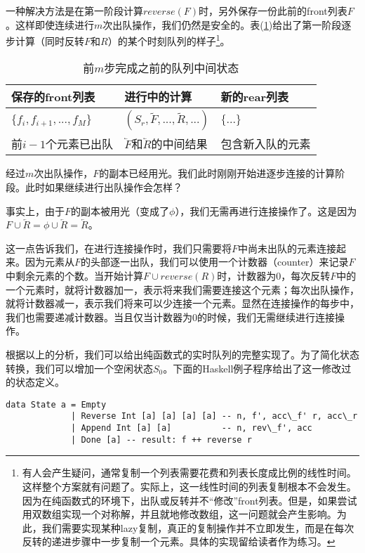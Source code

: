 \documentclass[UTF8]{article}
\begin{document}
一种解决方法是在第一阶段计算$reverse(F)$时，另外保存一份此前的front列表$F$。这样即使连续进行$m$次出队操作，我们仍然是安全的。表(\ref{tab:pop-before-m})给出了第一阶段逐步计算（同时反转$F$和$R$）的某个时刻队列的样子\footnote{有人会产生疑问，通常复制一个列表需要花费和列表长度成比例的线性时间。这样整个方案就有问题了。实际上，这一线性时间的列表复制根本不会发生。因为在纯函数式的环境下，出队或反转并不“修改”front列表。但是，如果尝试用双数组实现一个对称解，并且就地修改数组，这一问题就会产生影响。为此，我们需要实现某种lazy复制，真正的复制操作并不立即发生，而是在每次反转的递进步骤中一步复制一个元素。具体的实现留给读者作为练习。}。

\begin{table}[htbp]
\centering
\begin{tabular}{l l l}
  保存的front列表 & 进行中的计算 & 新的rear列表 \\
  \hline
  $\{ f_i, f_{i+1}, ..., f_M \}$ & $(S_r, \tilde{F}, ..., \tilde{R}, ...)$ & $ \{ ... \}$ \\
  前$i-1$个元素已出队 & $\overleftarrow{F}$和$\overleftarrow{R}$的中间结果 & 包含新入队的元素
\end{tabular}
\caption{前$m$步完成之前的队列中间状态}
\label{tab:pop-before-m}
\end{table}

经过$m$次出队操作，$F$的副本已经用光。我们此时刚刚开始进逐步连接的计算阶段。此时如果继续进行出队操作会怎样？

事实上，由于$F$的副本被用光（变成了$\phi$），我们无需再进行连接操作了。这是因为$F \cup \overleftarrow{R} = \phi \cup \overleftarrow{R} = \overleftarrow{R}$。

这一点告诉我们，在进行连接操作时，我们只需要将$F$中尚未出队的元素连接起来。因为元素从$F$的头部逐一出队，我们可以使用一个计数器（counter）来记录$F$中剩余元素的个数。当开始计算$F \cup reverse(R)$时，计数器为0，每次反转$F$中的一个元素时，就将计数器加一，表示将来我们需要连接这个元素；每次出队操作，就将计数器减一，表示我们将来可以少连接一个元素。显然在连接操作的每步中，我们也需要递减计数器。当且仅当计数器为0的时候，我们无需继续进行连接操作。

根据以上的分析，我们可以给出纯函数式的实时队列的完整实现了。为了简化状态转换，我们可以增加一个空闲状态$S_0$。下面的Haskell例子程序给出了这一修改过的状态定义。

\lstset{language=Haskell}
\begin{lstlisting}[style=Haskell]
data State a = Empty
             | Reverse Int [a] [a] [a] [a] -- n, f', acc\_f' r, acc\_r
             | Append Int [a] [a]          -- n, rev\_f', acc
             | Done [a] -- result: f ++ reverse r
\end{lstlisting}
\end{document}
